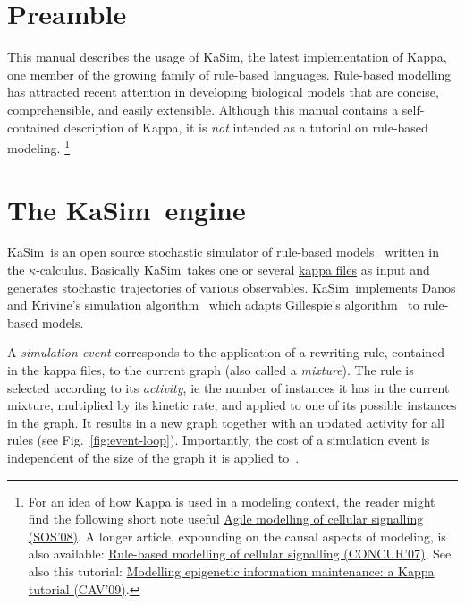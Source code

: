 \documentclass[11pt]{book}
\def\KaSim{\textsf{KaSim}}
\def\ka{\kappa}
\def\ie{ie }
\begin{document}
\section{Preamble}
This manual describes the usage of \KaSim, the latest implementation of Kappa, one member of the growing family of rule-based languages. Rule-based modelling has attracted recent attention in developing biological models that are concise, comprehensible, and easily extensible. 
Although this manual contains a self-contained description of Kappa, it is \emph{not} intended as a tutorial on rule-based modeling.%
%
\footnote{For an idea of how Kappa is used in a modeling context, the reader might find the following short note useful \href{http://www.pps.jussieu.fr/~danos/pdf/eov.pdf}{Agile modelling of cellular signalling (SOS'08)}. A longer article, expounding on the causal aspects of modeling, is also available: \href{http://www.pps.jussieu.fr/~danos/pdf/ka-fix.pdf}{Rule-based modelling of cellular signalling (CONCUR'07)}, See also this tutorial: \href{http://www.pps.jussieu.fr/~danos/pdf/mytdg.pdf}{Modelling epigenetic information maintenance: a Kappa tutorial (CAV'09)}. 
}%



\section{The \KaSim~engine}
\KaSim~is an open source stochastic simulator of rule-based models~\cite{DanLan04,Dan_etal07a,Fae_etal05} written in the $\ka$-calculus. Basically \KaSim~takes one or several \hyperref[chap:kappa]{kappa files} as input and generates stochastic trajectories of various observables. \KaSim~implements Danos and Krivine's simulation algorithm~\cite{Dan_etal07b} which adapts Gillespie's algorithm~\cite{Gil76,Gil77} to rule-based models. 

A \emph{simulation event} corresponds to the application of a rewriting rule, contained in the kappa files, to the current graph (also called a \emph{mixture}). The rule is selected according to its \emph{activity}, \ie the number of instances it has in the current mixture, multiplied by its kinetic rate, and applied to one of its possible instances in the graph. It results in a new graph together with an updated activity for all rules (see Fig.~\ref{fig:event-loop}). Importantly, the cost of a simulation event is independent of the size of the graph it is applied to~\cite{Dan_etal07b}. 
\end{document}
